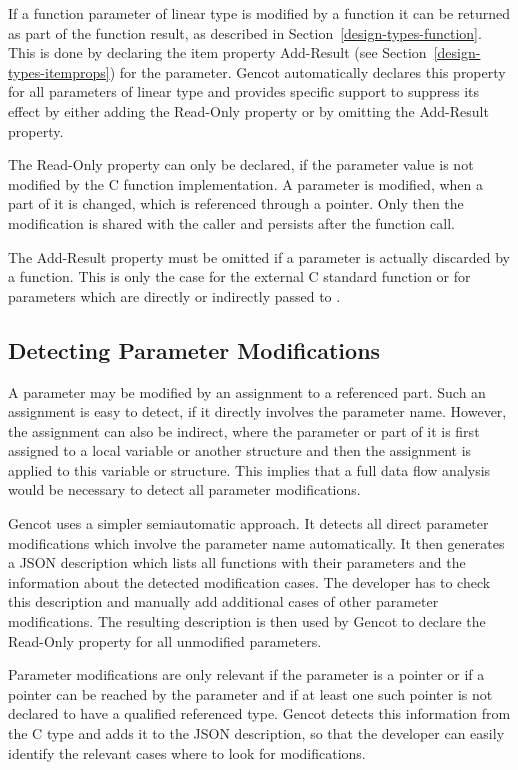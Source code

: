 If a function parameter of linear type is modified by a function it can be returned as part of the function result, 
as described in Section~\ref{design-types-function}. This is done by declaring the item property Add-Result 
(see Section~\ref{design-types-itemprops}) for the parameter. Gencot automatically declares this property for all 
parameters of linear type and provides specific support to suppress its effect by either adding the Read-Only 
property or by omitting the Add-Result property.

The Read-Only property can only be declared, if the parameter value is not modified by the C function implementation.
A parameter is modified, when a part of it is changed, which is referenced through a pointer. Only then the 
modification is shared with the caller and persists after the function call.

The Add-Result property must be omitted if a parameter is actually discarded by a function. This is only the case
for the external C standard function  or for parameters which are directly or indirectly passed to .

\subsection{Detecting Parameter Modifications}

A parameter may be modified by an assignment to a referenced part. Such an assignment
is easy to detect, if it directly involves the parameter name. However, the assignment can also be indirect, where
the parameter or part of it is first assigned to a local variable or another structure and then the assignment
is applied to this variable or structure. This implies that a full data flow analysis would be necessary
to detect all parameter modifications.

Gencot uses a simpler semiautomatic approach. It detects all direct parameter modifications which involve the 
parameter name automatically. It then generates a JSON description which lists all functions with their parameters
and the information about the detected modification cases. The developer has to check this description and
manually add additional cases of other parameter modifications. The resulting description is then used by
Gencot to declare the Read-Only property for all unmodified parameters.

Parameter modifications are only relevant if the parameter is a pointer or if a pointer can be reached by the parameter
and if at least one such pointer is not declared to have a  qualified referenced type. Gencot detects
this information from the C type and adds it to the JSON description, so that the developer can easily identify
the relevant cases where to look for modifications.

